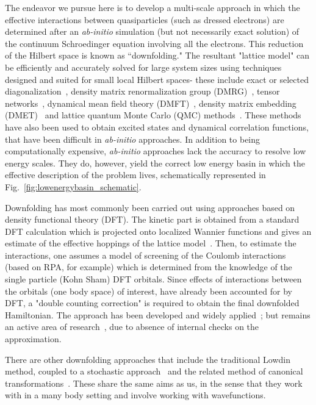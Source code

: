 The endeavor we pursue here is to develop a multi-scale approach in which the effective interactions between quasiparticles (such as dressed electrons) are determined after an \textit{ab-initio} simulation (but not necessarily exact solution) of the continuum Schroedinger equation involving all the electrons. 
This reduction of the Hilbert space is known as ``downfolding."
The resultant "lattice model" can be efficiently and accurately solved for large system sizes using techniques designed and suited for small local Hilbert spaces- these include exact or selected diagonalization~\cite{DeRaedt,Tubman_selci,Holmes_Tubman_Umrigar}, density matrix renormalization group (DMRG)~\cite{White1992}, tensor networks~\cite{PEPS,Changlani_CPS,NeuscammanCPS}, dynamical mean field theory (DMFT)~\cite{Kotliar2006}, density matrix embedding (DMET)~\cite{DMET_2012} and lattice quantum Monte Carlo (QMC) methods~\cite{Scalapino, Trivedi_Ceperley, Zhang_AFQMC, Sandvik_loops, Prokofiev, Booth2009,SQMC,Holmes_Changlani_Umrigar, Booth2013}. 
These methods have also been used to obtain excited states and dynamical correlation functions, that have been difficult in \textit{ab-initio} approaches. 
In addition to being computationally expensive, \textit{ab-initio} approaches lack the accuracy to resolve low energy scales. 
They do, however, yield the correct low energy basin in which the effective description of the problem lives, schematically represented in Fig.~\ref{fig:lowenergybasin_schematic}.

Downfolding has most commonly been carried out using approaches based on density functional theory (DFT). 
The kinetic part is obtained from a standard DFT calculation which is projected onto localized Wannier functions and gives an estimate of the effective hoppings of the lattice model~\cite{Pavirini}. 
Then, to estimate the interactions, one assumes a model of screening of the Coulomb interactions (based on RPA, for example) which is determined from the knowledge of the single particle (Kohn Sham) DFT orbitals. 
Since effects of interactions between the orbitals (one body space) of interest, have already been accounted for by DFT, a "double counting correction" is required to obtain the final downfolded Hamiltonian. 
The approach has been developed and widely applied~\cite{}; but remains an active area of research~\cite{Haule_doublecounting}, due to absence of internal checks on the approximation. 

There are other downfolding approaches that include the traditional Lowdin method, coupled to a stochastic approach~\cite{Tenno,Zhou_Ceperley} and the related method of canonical transformations~\cite{White_CT, Yanai_CT}. 
These share the same aims as us, in the sense that they work with in a many body setting and involve working with wavefunctions. 

